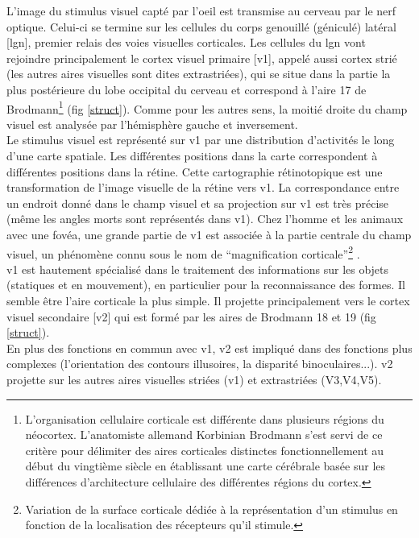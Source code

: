 L'image du stimulus visuel capté par l'oeil est transmise au cerveau par le nerf optique. Celui-ci se termine sur les cellules du corps genouillé (géniculé) latéral [\gls{lgn}], premier relais des voies visuelles corticales. Les cellules du \gls{lgn} vont rejoindre principalement le cortex visuel primaire [\gls{v1}], appelé aussi cortex strié (les autres aires visuelles sont dites extrastriées), qui se situe dans la partie la plus postérieure du lobe occipital du cerveau et correspond à l'aire 17 de Brodmann\footnote{L'organisation cellulaire corticale est différente dans plusieurs régions du néocortex. L'anatomiste allemand Korbinian Brodmann s'est servi de ce critère pour délimiter des aires corticales distinctes fonctionnellement au début du vingtième siècle en établissant une carte cérébrale basée sur les différences d'architecture cellulaire des différentes régions du cortex.} (fig \ref{struct}). Comme pour les autres sens, la moitié droite du champ visuel est analysée par l'hémisphère gauche et inversement.\\

Le stimulus visuel est représenté sur \gls{v1} par une distribution d'activités le long d'une carte spatiale. Les différentes positions dans la carte correspondent à différentes positions dans la rétine. Cette cartographie rétinotopique est une transformation de l'image visuelle de la rétine vers \gls{v1}. La correspondance entre un endroit donné dans le champ visuel et sa projection sur \gls{v1} est très précise (même les angles morts sont représentés dans \gls{v1}). Chez l'homme et les animaux avec une fovéa, une grande partie de \gls{v1} est associée à la partie centrale du champ visuel, un phénomène connu sous le nom de ``magnification corticale''\footnote{Variation de la surface corticale dédiée à la représentation d'un stimulus en fonction de la localisation des récepteurs qu'il stimule.} \cite{Daniel:1961}.\\

\gls{v1} est hautement spécialisé dans le traitement des informations sur les objets (statiques et en mouvement), en particulier pour la reconnaissance des formes. Il semble être l'aire corticale la plus simple. Il projette principalement vers le cortex visuel secondaire [\gls{v2}] qui est formé par les aires de Brodmann 18 et 19 (fig \ref{struct}).\\

En plus des fonctions en commun avec \gls{v1}, \gls{v2} est impliqué dans des fonctions plus complexes (l'orientation des contours illusoires, la disparité binoculaires...)\cite{Qiu:2005,Ts:2009}. \gls{v2} projette sur les autres aires visuelles striées (\gls{v1}) et extrastriées (V3,V4,V5).\\


